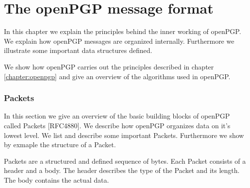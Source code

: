 \chapter{The openPGP message format} \label{chapter:messageformat}









In this chapter we explain the principles behind the inner working of openPGP. We explain how openPGP messages are organized internally. Furthermore we illustrate some important data structures defined.

We show how openPGP carries out the principles described in chapter \ref{chapter:openpgp} and give an overview of the algorithms used in openPGP.

\subsection{Packets}

In this section we give an overview of the basic building blocks of openPGP called Packets [RFC4880]. We describe how openPGP organizes data on it's lowest level. We list and describe some important Packets. Furthermore we show by exmaple the structure of a Packet. 

Packets are a structured and defined sequence of bytes.  Each Packet consists of a header and a body. The header describes the type of the Packet and its length. The body contains the actual data.

